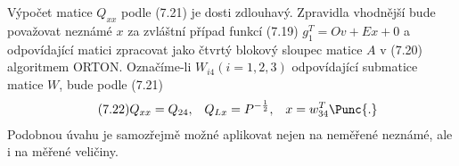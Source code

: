   \noindent
  Výpočet matice $Q_{xx}$ podle (7.21) je dosti zdlouhavý. Zpravidla
  vhodnější bude považovat neznámé $x$ za zvláštní případ funkcí
  (7.19) $g_1^T = Ov + E x + 0$ a odpovídající matici zpracovat jako
  čtvrtý blokový sloupec matice $A$ v (7.20) algoritmem ORTON.
  Označíme-li $W_{i4} (i=1,2,3)$ odpovídající submatice matice
  $W$, bude podle (7.21)
%
  \begin{align*}
    \tag{7.22}
    Q_{xx} &= Q_{24}, &Q_{Lx} &= P^{-{1\over2}}, &x &= w_{34}^T \Punc{.}
  \end{align*}
%
  Podobnou úvahu je samozřejmě možné aplikovat nejen na neměřené
  neznámé, ale i na měřené veličiny.
